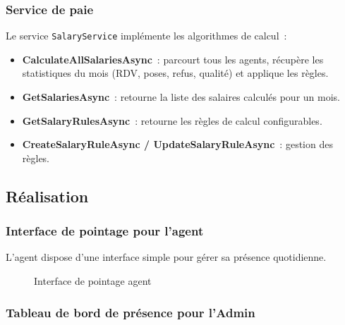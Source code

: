 \subsubsection{Service de paie}

Le service \texttt{SalaryService} implémente les algorithmes de calcul~:

\begin{itemize}
    \item \textbf{CalculateAllSalariesAsync}~: parcourt tous les agents, récupère les
    statistiques du mois (RDV, poses, refus, qualité) et applique les règles.
    \item \textbf{GetSalariesAsync}~: retourne la liste des salaires calculés pour un mois.
    \item \textbf{GetSalaryRulesAsync}~: retourne les règles de calcul configurables.
    \item \textbf{CreateSalaryRuleAsync / UpdateSalaryRuleAsync}~: gestion des règles.
\end{itemize}

\subsection{Réalisation}
\label{subsec:sprint5_realisation}

\subsubsection{Interface de pointage pour l'agent}

L'agent dispose d'une interface simple pour gérer sa présence quotidienne.

\begin{figure}[H]
    \centering
    \caption{Interface de pointage agent}
    \label{fig:sprint5_clock_interface}
\end{figure}

\subsubsection{Tableau de bord de présence pour l'Admin}

